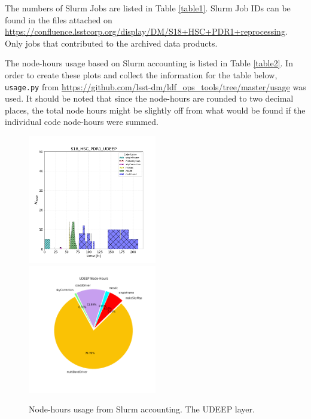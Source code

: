 The numbers of Slurm Jobs are listed in Table \ref{table1}.
Slurm Job IDs can be found in the files attached on \url{https://confluence.lsstcorp.org/display/DM/S18+HSC+PDR1+reprocessing}.
Only jobs that contributed to the archived data products.


The node-hours usage based on Slurm accounting is listed in Table \ref{table2}. 
In order to create these plots and collect the information for the table below, \texttt{usage.py} from \url{https://github.com/lsst-dm/ldf_ops_tools/tree/master/usage} was used.  It should be noted that since the node-hours are rounded to two decimal places, the total node hours might be slightly off from what would be found if the individual code node-hours were summed.


\begin{figure}[h]
\includegraphics[width=0.50\textwidth]{usage-S18_HSC_PDR1_UDEEP.png}
\includegraphics[width=0.50\textwidth]{PDR1_UDEEP_pie.png}
\caption{Node-hours usage from Slurm accounting. The UDEEP layer.}
\label{figs}
\end{figure}
